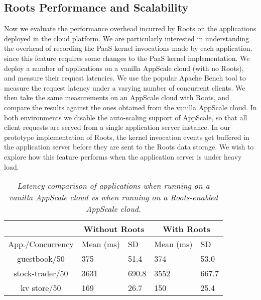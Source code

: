 \subsection{Roots Performance and Scalability}

Now we evaluate the performance overhead incurred by Roots on the applications deployed in the 
cloud platform. We are particularly interested in understanding the overhead of recording the PaaS kernel
invocations made by each application, since this feature requires some changes to the PaaS kernel
implementation. 
We deploy a number of applications on a vanilla
AppScale cloud (with no Roots), and measure their request latencies. We use
the popular Apache Bench tool to measure the request latency under a
varying number of concurrent clients. We then take the same measurements
on an AppScale cloud with Roots, and compare the results against the ones obtained
from the vanilla AppScale cloud. In both environments we disable the auto-scaling
support of AppScale, so that all client requests are served from a single application
server instance. In our prototype implementation of Roots, the kernel invocation events get buffered in
the application server before they are sent to the Roots data storage. We wish to
explore how this feature performs when the application server is under heavy load.

\begin{table}
{\footnotesize
\begin{center}
\begin{tabular}{|c|p{0.8cm}|p{0.8cm}|p{0.8cm}|p{0.8cm}|}
\hline &
      \multicolumn{2}{c|}{Without Roots} &
      \multicolumn{2}{c|}{With Roots} \\ \hline
    App./Concurrency & Mean (ms) & SD & Mean (ms) & SD\\

\hline
guestbook/50 & 375 & 51.4 & 374 & 53.0 \\ \hline
stock-trader/50 & 3631 & 690.8 & 3552 & 667.7 \\ \hline
kv store/50 & 169 & 26.7  & 150 & 25.4  \\ \hline
\end{tabular}
\end{center}
}
\vspace{-0.2in}
\caption{\textit{Latency comparison of applications when running on
a vanilla AppScale cloud vs when running on a Roots-enabled
AppScale cloud.}
\label{tab:perf_overhead}
}
\vspace{-0.2in}
\end{table}

